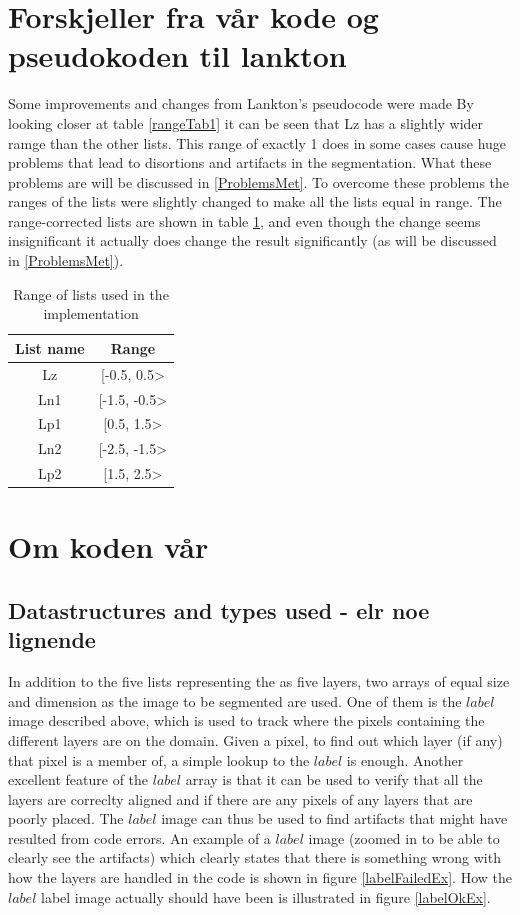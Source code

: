 \section{Forskjeller fra vår kode og pseudokoden til lankton}
Some improvements and changes from Lankton's pseudocode were made
By looking closer at table \ref{rangeTab1} it can be seen that Lz has a slightly wider ramge than the other lists. This range of exactly 1 does in some cases cause huge problems that lead to disortions and artifacts in the segmentation. What these problems are will be discussed in \ref{ProblemsMet}. To overcome these problems the ranges of the lists were slightly changed to make all the lists equal in range. The range-corrected lists are shown in table \ref{rangeTab2}, and even though the change seems insignificant it actually does change the result significantly (as will be discussed in \ref{ProblemsMet}).

\begin{table}[h] %
	\begin{tabular}{| c | c |} 
	\hline
	List name & Range\\
	\hline
	Lz & [-0.5, 0.5>\\
	Ln1 & [-1.5, -0.5>\\
	Lp1 & [0.5, 1.5>\\
	Ln2 & [-2.5, -1.5>\\
	Lp2 & [1.5, 2.5>\\
	\hline
	\end{tabular}
	\caption{Range of lists used in the implementation}
	\label{rangeTab2}
\end{table}

\section{Om koden vår}
\subsection{Datastructures and types used - elr noe lignende}
In addition to the five lists representing the as five layers, two arrays of equal size and dimension as the image to be segmented are used. One of them is the $label$ image described above, which is used to track where the pixels containing the different layers are on the domain. Given a pixel, to find out which layer (if any) that pixel is a member of, a simple lookup to the $label$ is enough. Another excellent feature of the $label$ array is that it can be used to verify that all the layers are correclty aligned and if there are any pixels of any layers that are poorly placed. The $label$ image can thus be used to find artifacts that might have resulted from code errors. An example of a $label$ image (zoomed in to be able to clearly see the artifacts) which clearly states that there is something wrong with how the layers are handled in the code is shown in figure \ref{labelFailedEx}. How the $label$ label image actually should have been is illustrated in figure \ref{labelOkEx}.

